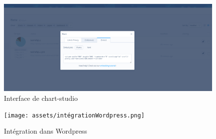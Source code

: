 \documentclass[11pt]{article}
\begin{document}
\begin{figure}
    \includegraphics[width=\linewidth]{assets/chart-studio.png}
    \caption{Interface de chart-studio}
\end{figure}

\begin{figure}
    \texttt{[image: assets/intégrationWordpress.png]}
    \caption{Intégration dans Wordpress}
\end{figure}
\end{document}
